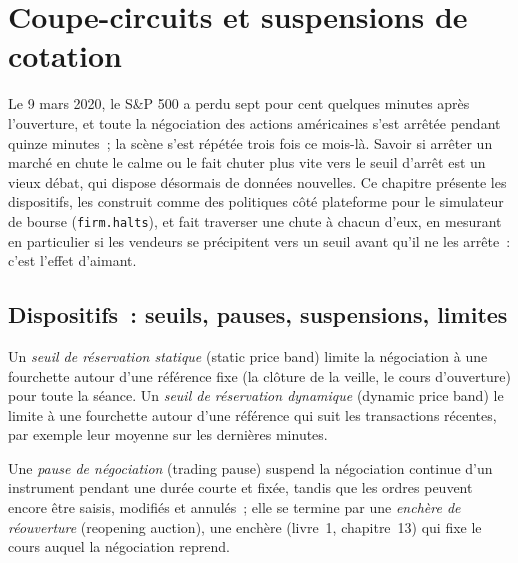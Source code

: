 \chapter{Coupe-circuits et suspensions de cotation}\label{ch:mx:circuit-breakers-and-halts}

Le 9 mars 2020, le S\&P 500 a perdu sept pour cent quelques minutes après l'ouverture, et toute la négociation des actions américaines s'est arrêtée pendant quinze minutes~; la scène s'est répétée trois
fois ce mois-là. Savoir si arrêter un marché en chute le calme ou le fait chuter plus vite vers le seuil d'arrêt est un vieux débat, qui dispose désormais de données nouvelles. Ce chapitre
présente les dispositifs, les construit comme des politiques côté plateforme pour le simulateur de bourse (\texttt{firm.halts}), et fait traverser une chute à chacun d'eux, en mesurant
en particulier si les vendeurs se précipitent vers un seuil avant qu'il ne les arrête~: c'est l'effet d'aimant.

\section{Dispositifs~: seuils, pauses, suspensions, limites}

\begin{definition}\label{def:mx:circuit-breakers-and-halts:bands}
Un \emph{seuil de réservation statique} (static price band) limite la négociation à une fourchette autour d'une référence fixe (la clôture de la veille, le cours d'ouverture) pour
toute la séance. Un \emph{seuil de réservation dynamique} (dynamic price band) le limite à une fourchette autour d'une référence qui suit les transactions récentes, par exemple
leur moyenne sur les dernières minutes.
\end{definition}

\begin{definition}\label{def:mx:circuit-breakers-and-halts:pause}
Une \emph{pause de négociation} (trading pause) suspend la négociation continue d'un instrument pendant une durée courte et fixée, tandis que les ordres peuvent encore être saisis,
modifiés et annulés~; elle se termine par une \emph{enchère de réouverture} (reopening auction), une enchère (livre~1, chapitre~13) qui fixe le cours
auquel la négociation reprend.
\end{definition}

